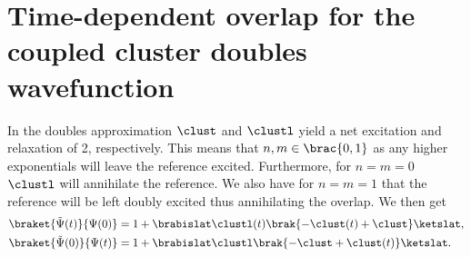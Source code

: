     \section{Time-dependent overlap for the coupled cluster doubles
    wavefunction}
        In the doubles approximation $\clust$ and $\clustl$ yield a net
        excitation and relaxation of 2, respectively. This means that $n, m \in
        \brac{0, 1}$ as any higher exponentials will leave the reference
        excited. Furthermore, for $n = m = 0$ $\clustl$ will annihilate the
        reference. We also have for $n = m = 1$ that the reference will be left
        doubly excited thus annihilating the overlap. We then get
        \begin{align}
            \braket{\tilde{\Psi}(t)}{\Psi(0)}
            &= 1 + \brabislat\clustl(t)\brak{
                -\clust(t) + \clust
            }\ketslat,
            \\
            \braket{\tilde{\Psi}(0)}{\Psi(t)}
            &= 1 + \brabislat\clustl\brak{
                -\clust + \clust(t)
            }\ketslat.
        \end{align}

